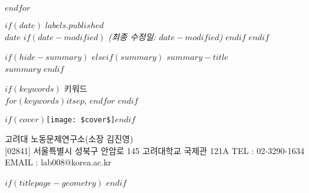 \begin{minipage}[b][\textheight][s]{\textwidth}
\begin{titlepagebox}
\begin{multicols}{2}
$endfor$
\end{multicols}

\vspace{-4mm}


$if(date)$
{\textcolor{anugold}{\MakeUppercase{$labels.published$}}}\\ $date$
$if(date-modified)$
{\itshape{(최종 수정일: $date-modified$)}}
$endif$
\vspace{3mm}
$endif$

$if(hide-summary)$
$elseif(summary)$
\textcolor{anugold}{\MakeUppercase{$summary-title$}}\\
$summary$
$endif$
\vspace{3mm}

$if(keywords)$
{\textcolor{anugold}{키워드}}\\
$for(keywords)$$it$$sep$, $endfor$
$endif$

\end{titlepagebox}

\vspace{2\baselineskip}


\vfill

$if(cover)$\texttt{[image: \$cover\$]}$endif$

고려대 노동문제연구소(소장 김진영)\\{\footnotesize [02841] 서울특별시 성북구 안암로 145 고려대학교 국제관 121A TEL : 02-3290-1634
EMAIL : lab008@korea.ac.kr}

\end{minipage}
$if(titlepage-geometry)$
\restoregeometry
$endif$
